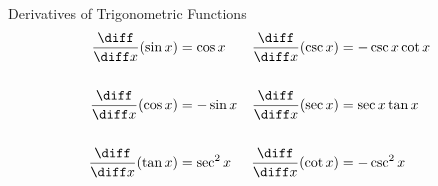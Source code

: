 \begin{frame}
Derivatives of Trigonometric Functions
\begin{align*}
  \frac{\diff}{\diff x}(\sin x) & = \cos x & %
  \frac{\diff}{\diff x}(\csc x) & = -\csc x\cot x \\ %
& & \\
  \frac{\diff}{\diff x}(\cos x) & = -\sin x & %
  \frac{\diff}{\diff x}(\sec x) & = \sec x\tan x \\ %
& & \\
  \frac{\diff}{\diff x}(\tan x) & = \sec^2 x & %
  \frac{\diff}{\diff x}(\cot x) & = -\csc^2 x  %
\end{align*}
\end{frame}

